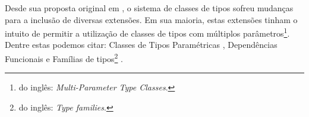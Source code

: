 Desde sua proposta original em \cite{Wadler89}, o sistema de classes de tipos sofreu mudan\c{c}as
para a inclus\~ ao de diversas extens\~oes. Em sua maioria, estas extens\~oes tinham o intuito de permitir a 
utiliza\c{c}\~ao de classes de tipos com m\'ultiplos par\^ametros\footnote{do ingl\^es: \emph{Multi-Parameter Type
Classes}.}. Dentre estas podemos citar: Classes de Tipos Param\'etricas \cite{Chen92}, Depend\^encias Funcionais 
\cite{Jones00, Jones09, Sulzmann06a} e Fam\'ilias de tipos\footnote{do ingl\^es: \emph{Type families}.} 
\cite{Schrijvers2008, Chakravarty05}. 



